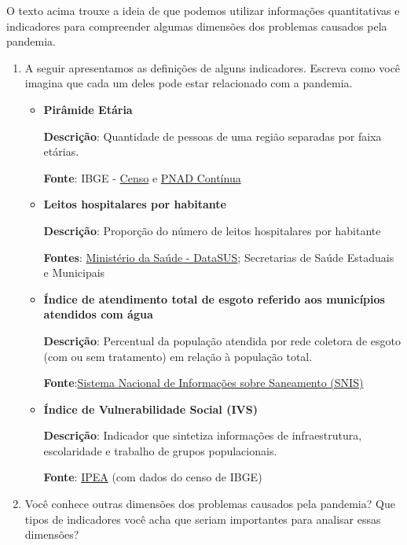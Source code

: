 \begin{task}{}

O texto acima trouxe a ideia de que podemos utilizar informações quantitativas e indicadores para compreender algumas dimensões dos problemas causados pela pandemia.

\begin{enumerate}
\item A seguir apresentamos as definições de alguns indicadores. Escreva como você imagina que cada um deles pode estar relacionado com a pandemia.

\begin{itemize}[itemsep=1em]
\setlength\parskip{-2pt}
\item \textbf{Pirâmide Etária}

\textbf{Descrição}: Quantidade de pessoas de uma região separadas por faixa etárias.

\textbf{Fonte}: IBGE - \href{https://www.ibge.gov.br/estatisticas/sociais/populacao/25089-censo-1991-6.html?=&t=o-que-e}{Censo} e \href{https://www.ibge.gov.br/estatisticas/sociais/populacao/9173-pesquisa-nacional-por-amostra-de-domicilios-continua-trimestral.html?t=destaques}{PNAD Contínua}

\item \textbf{Leitos hospitalares por habitante}

\textbf{Descrição}: Proporção do número de leitos hospitalares por habitante

\textbf{Fontes}: \href{https://datasus.saude.gov.br/}{Ministério da Saúde - DataSUS}; Secretarias de Saúde Estaduais e Municipais

\item \textbf{Índice de atendimento total de esgoto referido aos municípios atendidos com água}

\textbf{Descrição}: Percentual da população atendida por rede coletora de esgoto (com ou sem tratamento) em relação à população total.

\textbf{Fonte}:\href{http://www.snis.gov.br/painel-informacoes-saneamento-brasil/web/painel-setor-saneamento}{Sistema Nacional de Informações sobre Saneamento (SNIS)}


\item \textbf{Índice de Vulnerabilidade Social (IVS)}

\textbf{Descrição}: Indicador que sintetiza informações de infraestrutura, escolaridade e trabalho de grupos populacionais.

\textbf{Fonte}: \href{http://ivs.ipea.gov.br/index.php/pt/}{IPEA} (com dados do censo de IBGE)
\end{itemize}

\item Você conhece outras dimensões dos problemas causados pela pandemia? Que tipos de indicadores você acha que seriam importantes para analisar essas dimensões?

\end{enumerate}


\end{task}

